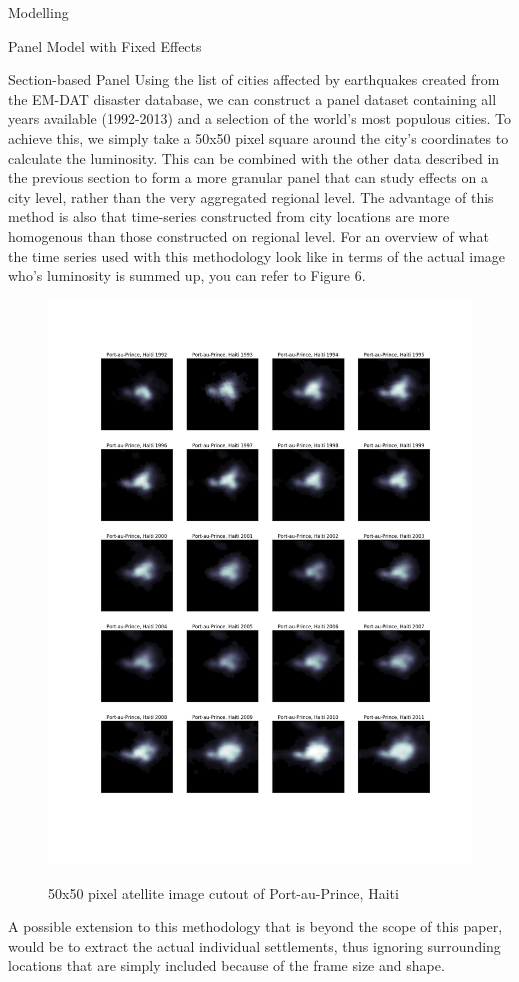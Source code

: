 \documentclass[12.5pt,fleqn,leqno,letterpaper]{article}
\begin{document}
\begin{section}{Modelling}
\begin{subsection}{Panel Model with Fixed Effects}
    \begin{subsubsection}{Section-based Panel}
      Using the list of cities affected by earthquakes created from the EM-DAT disaster database, we can construct a panel dataset containing all years available (1992-2013) and a selection of the world's most populous cities. To achieve this, we simply take a 50x50 pixel square around the city's coordinates to calculate the luminosity. This can be combined with the other data described in the previous section to form a more granular panel that can study effects on a city level, rather than the very aggregated regional level. The advantage of this method is also that time-series constructed from city locations are more homogenous than those constructed on regional level. For an overview of what the time series used with this methodology look like in terms of the actual image who's luminosity is summed up, you can refer to Figure 6.\\
      \begin{figure}
        \centering
        \includegraphics[width=\linewidth]{haiti_luminosity_series}\label{fig:haiti_luminosity_series}
        \caption{50x50 pixel atellite image cutout of Port-au-Prince, Haiti}
      \end{figure}
      A possible extension to this methodology that is beyond the scope of this paper, would be to extract the actual individual settlements, thus ignoring surrounding locations that are simply included because of the frame size and shape.
    \end{subsubsection}


\end{subsection}
\end{section}
\end{document}
